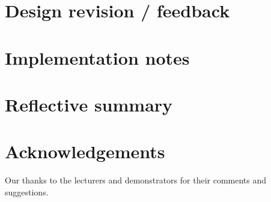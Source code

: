 \documentclass{sig-alt-release2}
\begin{document}

\section{Design revision / feedback}



\section{Implementation notes}



\section{Reflective summary}



\section{Acknowledgements}
Our thanks to the lecturers and demonstrators for their comments and suggestions.




%
\end{document}
